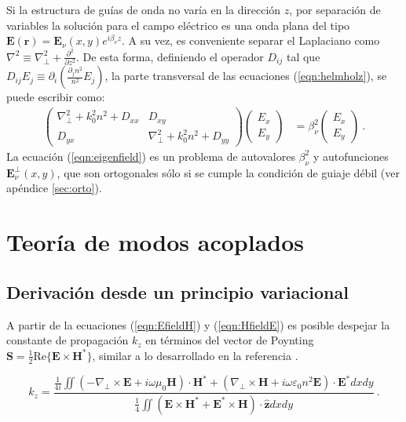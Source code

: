 Si la estructura de guías de onda no varía en la dirección $z$, por separación de variables la solución para el campo eléctrico es una onda plana del tipo $\textbf{E}(\textbf{r}) = \textbf{E}_\nu(x, y) e^{i\beta_\nu z}$. A su vez, es conveniente separar el Laplaciano como $\nabla^2 \equiv \nabla_\perp^2 + \frac{\partial^2}{\partial z^2}$. De esta forma, definiendo el operador $D_{ij}$ tal que $D_{ij} E_j \equiv \partial_i\left(\frac{\partial_j n^2}{n^2}E_j \right) $, la parte transversal de las ecuaciones (\ref{eqn:helmholz}), se puede escribir como:
\begin{align}
	\begin{pmatrix}
	\nabla_\perp^2  + k_0^2n^2 + D_{xx} & D_{xy} 
	\\
	D_{yx}  & \nabla_\perp^2  + k_0^2n^2 + D_{yy} 
	\end{pmatrix}
	\begin{pmatrix}
	E_x
	\\
	E_y
	\end{pmatrix}
		&=
	\beta_\nu^2 
	\begin{pmatrix}
	E_x
	\\
	E_y
	\end{pmatrix} \ . \label{eqn:eigenfield}
\end{align}
La ecuación (\ref{eqn:eigenfield}) es un problema de autovalores $\beta_\nu^2$ y autofunciones $\textbf{E}_\nu^\perp(x,y)$, que son ortogonales sólo si se cumple la condición de guiaje débil (ver apéndice \ref{sec:orto}). 

\section{Teoría de modos acoplados}

\subsection{Derivación desde un principio variacional}

A partir de la ecuaciones (\ref{eqn:EfieldH}) y (\ref{eqn:HfieldE}) es posible despejar la constante de propagación $k_z$ en términos del vector de Poynting $\textbf{S} = \frac{1}{2} \text{Re}\{\textbf{E} \times \textbf{H}^*\}$, similar a lo desarrollado en la referencia \citep{haus_coupled-mode}.

\begin{equation}
	k_z = \frac{\frac{1}{4i}\iint \left(-\nabla_\perp \times \textbf{E} + i\omega \mu_0 \textbf{H} \right)\cdot\textbf{H}^* + \left(\nabla_\perp\times\textbf{H} + i\omega \varepsilon_0 n^2 \textbf{E} \right)\cdot \textbf{E}^* dxdy}{\frac{1}{4} \iint \left( \textbf{E}\times\textbf{H}^* + \textbf{E}^*\times\textbf{H}  \right) \cdot \hat{\textbf{z}} dxdy} \ . \label{eqn:kzprevar}
\end{equation}

